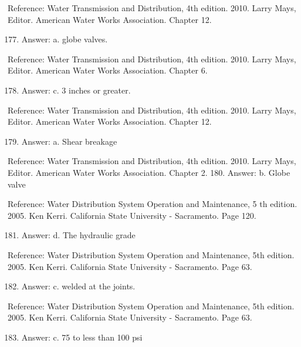 \documentclass[10pt]{article}
\begin{document}
Reference: Water Transmission and Distribution, 4th edition. 2010. Larry Mays, Editor. American Water Works Association. Chapter 12.

\begin{enumerate}
  \setcounter{enumi}{176}
  \item Answer: a. globe valves.
\end{enumerate}

Reference: Water Transmission and Distribution, 4th edition. 2010. Larry Mays, Editor. American Water Works Association. Chapter 6.

\begin{enumerate}
  \setcounter{enumi}{177}
  \item Answer: c. 3 inches or greater.
\end{enumerate}

Reference: Water Transmission and Distribution, 4th edition. 2010. Larry Mays, Editor. American Water Works Association. Chapter 12.

\begin{enumerate}
  \setcounter{enumi}{178}
  \item Answer: a. Shear breakage
\end{enumerate}

Reference: Water Transmission and Distribution, 4th edition. 2010. Larry Mays, Editor. American Water Works Association. Chapter 2. 180. Answer: b. Globe valve

Reference: Water Distribution System Operation and Maintenance, 5 th edition. 2005. Ken Kerri. California State University - Sacramento. Page 120.

\begin{enumerate}
  \setcounter{enumi}{180}
  \item Answer: d. The hydraulic grade
\end{enumerate}

Reference: Water Distribution System Operation and Maintenance, 5th edition. 2005. Ken Kerri. California State University - Sacramento. Page 63.

\begin{enumerate}
  \setcounter{enumi}{181}
  \item Answer: c. welded at the joints.
\end{enumerate}

Reference: Water Distribution System Operation and Maintenance, 5th edition. 2005. Ken Kerri. California State University - Sacramento. Page 63.

\begin{enumerate}
  \setcounter{enumi}{182}
  \item Answer: c. 75 to less than 100 psi
\end{enumerate}
\end{document}
